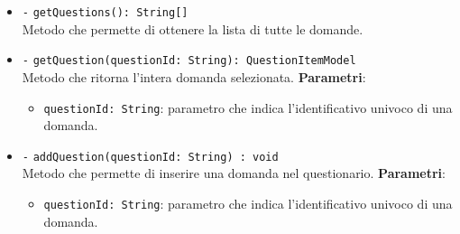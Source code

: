 \begin{itemize}
\begin{itemize}
			\item \texttt{-} \texttt{getQuestions(): String[]} \\
			Metodo che permette di ottenere la lista di tutte le domande.
			\item \texttt{-} \texttt{getQuestion(questionId: String): QuestionItemModel} \\
			Metodo che ritorna l'intera domanda selezionata.
			\textbf{Parametri}:
			\begin{itemize}
				\item \texttt{questionId: String}: parametro che indica l'identificativo univoco di una domanda.
			\end{itemize}
			\item \texttt{-} \texttt{addQuestion(questionId: String) : void} \\
			Metodo che permette di inserire una domanda nel questionario.
			\textbf{Parametri}:
			\begin{itemize}
				\item \texttt{questionId: String}: parametro che indica l'identificativo univoco di una domanda.
			\end{itemize}
		\end{itemize}
	\end{itemize}
	
	